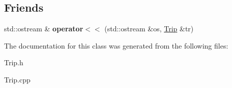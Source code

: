 \subsection*{Friends}
\begin{DoxyCompactItemize}
\item 
\mbox{\label{classTrip_ad143ba29c1778aa25a53301503c3f2bd}} 
std\+::ostream \& {\bfseries operator$<$$<$} (std\+::ostream \&os, \mbox{\hyperlink{classTrip}{Trip}} \&tr)
\end{DoxyCompactItemize}


The documentation for this class was generated from the following files\+:\begin{DoxyCompactItemize}
\item 
Trip.\+h\item 
Trip.\+cpp\end{DoxyCompactItemize}
